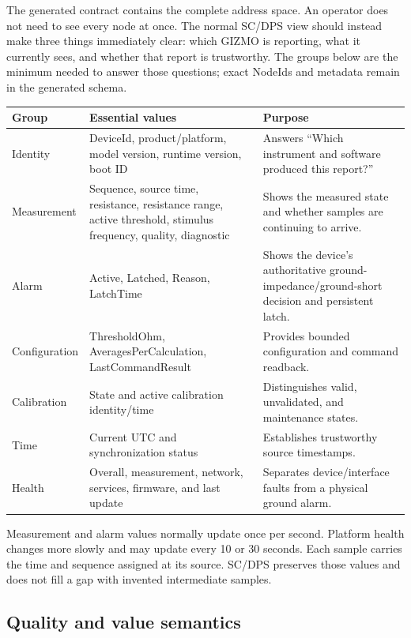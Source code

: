 \documentclass{cernatlasnote}
\begin{document}
The generated contract contains the complete address space. An operator does
not need to see every node at once. The normal SC/DPS view should instead make
three things immediately clear: which GIZMO is reporting, what it currently
sees, and whether that report is trustworthy. The groups below are the minimum
needed to answer those questions; exact NodeIds and metadata remain in the
generated schema.

\begin{longtable}{L{0.20\textwidth} L{0.31\textwidth} L{0.39\textwidth}}
\toprule
\textbf{Group} & \textbf{Essential values} & \textbf{Purpose} \\
\midrule
Identity & DeviceId, product/platform, model version, runtime version, boot ID
& Answers ``Which instrument and software produced this report?'' \\
Measurement & Sequence, source time, resistance, resistance range, active
threshold, stimulus frequency, quality, diagnostic & Shows the measured state
and whether samples are continuing to arrive. \\
Alarm & Active, Latched, Reason, LatchTime & Shows the device's authoritative
ground-impedance/ground-short decision and persistent latch. \\
Configuration & ThresholdOhm, AveragesPerCalculation, LastCommandResult &
Provides bounded configuration and command readback. \\
Calibration & State and active calibration identity/time & Distinguishes valid,
unvalidated, and maintenance states. \\
Time & Current UTC and synchronization status & Establishes trustworthy source
timestamps. \\
Health & Overall, measurement, network, services, firmware, and last update &
Separates device/interface faults from a physical ground alarm. \\
\bottomrule
\end{longtable}

Measurement and alarm values normally update once per second. Platform health
changes more slowly and may update every 10 or 30 seconds. Each sample carries
the time and sequence assigned at its source. SC/DPS preserves those values and
does not fill a gap with invented intermediate samples.

\subsection{Quality and value semantics}
\end{document}
